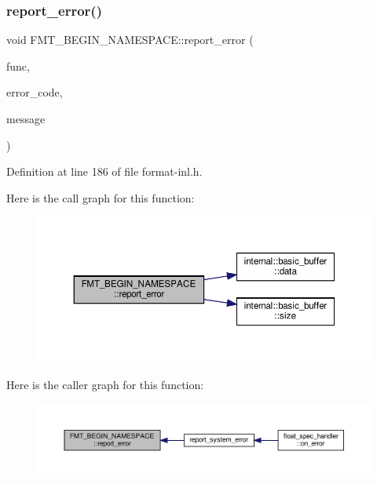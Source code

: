\subsubsection{\texorpdfstring{report\+\_\+error()}{report\_error()}}
{\footnotesize\ttfamily void F\+M\+T\+\_\+\+B\+E\+G\+I\+N\+\_\+\+N\+A\+M\+E\+S\+P\+A\+C\+E\+::report\+\_\+error (\begin{DoxyParamCaption}\item[{\hyperlink{namespace_f_m_t___b_e_g_i_n___n_a_m_e_s_p_a_c_e_a6da944ca5d9656fe12a5c1f629f665ff}{Format\+Func}}]{func,  }\item[{int}]{error\+\_\+code,  }\item[{\hyperlink{core_8h_a17e3ff7f9ac2b8f068f719b829890036}{string\+\_\+view}}]{message }\end{DoxyParamCaption})}



Definition at line 186 of file format-\/inl.\+h.

Here is the call graph for this function\+:
\nopagebreak
\begin{figure}[H]
\begin{center}
\leavevmode
\includegraphics[width=350pt]{namespace_f_m_t___b_e_g_i_n___n_a_m_e_s_p_a_c_e_a9a8134e5f6a1fb2e4fca1b8efdbb3927_cgraph}
\end{center}
\end{figure}
Here is the caller graph for this function\+:
\nopagebreak
\begin{figure}[H]
\begin{center}
\leavevmode
\includegraphics[width=350pt]{namespace_f_m_t___b_e_g_i_n___n_a_m_e_s_p_a_c_e_a9a8134e5f6a1fb2e4fca1b8efdbb3927_icgraph}
\end{center}
\end{figure}
\mbox{\label{namespace_f_m_t___b_e_g_i_n___n_a_m_e_s_p_a_c_e_a3770dc340d58166b701180e092935e12}} 
